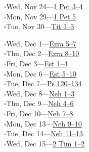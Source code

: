 \hypertarget{rp-2027-11-24}{}\noindent$\square$\enspace Wed, Nov 24\enspace---\enspace \hyperlink{ch-1peter-3}{1 Pet 3--4}\\
\hypertarget{rp-2027-11-29}{}\noindent$\square$\enspace Mon, Nov 29\enspace---\enspace \hyperlink{ch-1peter-5}{1 Pet 5}\\
\hypertarget{rp-2027-11-30}{}\noindent$\square$\enspace Tue, Nov 30\enspace---\enspace \hyperlink{ch-titus-1}{Tit 1--3}\\
\clearpage
\twocolumn[%
  \vspace*{20pt}%
  {\centering\huge\booktitlefont\scshape December 2027\\%
  \char"2766\par}%
  \vspace{10pt}%
]

\hypertarget{rp-2027-12-01}{}\noindent$\square$\enspace Wed, Dec 1\enspace---\enspace \hyperlink{ch-ezra-5}{Ezra 5--7}\\
\hypertarget{rp-2027-12-02}{}\noindent$\square$\enspace Thu, Dec 2\enspace---\enspace \hyperlink{ch-ezra-8}{Ezra 8--10}\\
\hypertarget{rp-2027-12-03}{}\noindent$\square$\enspace Fri, Dec 3\enspace---\enspace \hyperlink{ch-esther-1}{Est 1--4}\\
\hypertarget{rp-2027-12-06}{}\noindent$\square$\enspace Mon, Dec 6\enspace---\enspace \hyperlink{ch-esther-5}{Est 5--10}\\
\hypertarget{rp-2027-12-07}{}\noindent$\square$\enspace Tue, Dec 7\enspace---\enspace \hyperlink{ch-psalms-120}{Ps 120--134}\\
\hypertarget{rp-2027-12-08}{}\noindent$\square$\enspace Wed, Dec 8\enspace---\enspace \hyperlink{ch-nehemiah-1}{Neh 1--3}\\
\hypertarget{rp-2027-12-09}{}\noindent$\square$\enspace Thu, Dec 9\enspace---\enspace \hyperlink{ch-nehemiah-4}{Neh 4--6}\\
\hypertarget{rp-2027-12-10}{}\noindent$\square$\enspace Fri, Dec 10\enspace---\enspace \hyperlink{ch-nehemiah-7}{Neh 7--8}\\
\hypertarget{rp-2027-12-13}{}\noindent$\square$\enspace Mon, Dec 13\enspace---\enspace \hyperlink{ch-nehemiah-9}{Neh 9--10}\\
\hypertarget{rp-2027-12-14}{}\noindent$\square$\enspace Tue, Dec 14\enspace---\enspace \hyperlink{ch-nehemiah-11}{Neh 11--13}\\
\hypertarget{rp-2027-12-15}{}\noindent$\square$\enspace Wed, Dec 15\enspace---\enspace \hyperlink{ch-2timothy-1}{2 Tim 1--2}\\
